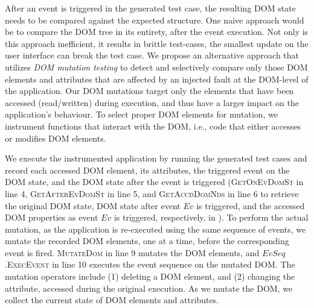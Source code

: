  After an event is triggered in the generated \selenium test case, the resulting DOM state needs to be compared against the expected structure. One naive approach would be to compare the DOM tree in its entirety, after the event execution. 
Not only is this approach inefficient, it results in brittle test-cases, \ie the smallest update on the user interface can break the test case. 
We propose an alternative approach that utilizes  \emph{DOM mutation testing} to detect and selectively compare only those DOM elements and attributes that are affected by an injected fault at the DOM-level of the application.
Our DOM mutations target only the elements that have been accessed (read/written) during execution, and thus have a larger impact on the application's behaviour. 
To select proper DOM elements for mutation, we instrument \javascript functions that interact with the DOM, i.e., code that either accesses or modifies  DOM elements. 

We execute the instrumented application by running the generated \selenium test cases and record each accessed DOM element,
 its attributes, the triggered event on the DOM state, and the DOM state after the event is triggered (\textsc{GetOnEvDomSt} in line 4, \textsc{GetAfterEvDomSt} in line 5, and \textsc{GetAccdDomNds} in line 6 to retrieve the original DOM state, DOM state after event $Ev$ is triggered, and the accessed DOM properties as event $Ev$ is triggered, respectively, in ). To perform the actual mutation, as the application is re-executed using the same sequence of events, we mutate the recorded DOM elements, one at a time, before the corresponding event is fired. \textsc{MutateDom} in line 9 mutates the DOM elements, and $EvSeq$\textsc{.ExecEvent} in line 10 executes the event sequence on the mutated DOM. 
The mutation operators include (1) deleting a DOM element, and (2) changing the attribute, accessed during the original execution. 
As we mutate the DOM, we collect the current state of DOM elements and attributes. 

